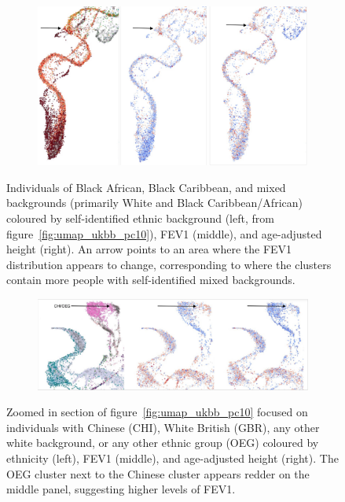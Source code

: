 \documentclass[12pt]{pnas-new}
\begin{document}
\begin{figure}
    \centering
    \begin{subfigure}{\textwidth}
    \includegraphics[width=\textwidth]{images/montage_fev1_height_afr_permuted.pdf}
    \end{subfigure}
    \caption{Individuals of Black African, Black Caribbean, and mixed backgrounds (primarily White and Black Caribbean/African) coloured by self-identified ethnic background (left, from figure~\ref{fig:umap_ukbb_pc10}), FEV1 (middle), and age-adjusted height (right). An arrow points to an area where the FEV1 distribution appears to change, corresponding to where the clusters contain more people with self-identified mixed backgrounds.}
    \label{fig:supp_comparison_fev_afr}
\end{figure}

\begin{figure}
    \centering
    \begin{subfigure}{\textwidth}
    \includegraphics[width=\textwidth]{images/montage_fev1_height_chi_eur_permuted.png}
    \end{subfigure}
    \caption{Zoomed in section of figure~\ref{fig:umap_ukbb_pc10} focused on individuals with Chinese (CHI), White British (GBR), any other white background, or any other ethnic group (OEG) coloured by ethnicity (left), FEV1 (middle), and age-adjusted height (right). The OEG cluster next to the Chinese cluster appears redder on the middle panel, suggesting higher levels of FEV1.}
    \label{fig:supp_comparison_fev_chi_eur}
\end{figure}
\end{document}
